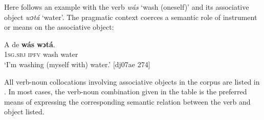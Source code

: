 Here follows an example with the verb \textit{wás} ‘wash (oneself)’ and its associative object \textit{wɔtá} ‘water’. The pragmatic context coerces a semantic role of instrument or means on the associative object: 



\ea%
    \label{ex:key:1172}
    \gll A    de  \textbf{wás}    \textbf{wɔtá}.\\
\textsc{1sg.sbj}  \textsc{ipfv}  wash  water\\

\glt ‘I’m washing (myself with) water.’ [dj07ae 274]
\z

All verb-noun collocations involving associative objects in the corpus are listed in . In most cases, the verb-noun combination given in the table is the preferred means of expressing the corresponding semantic relation between the verb and object listed.

